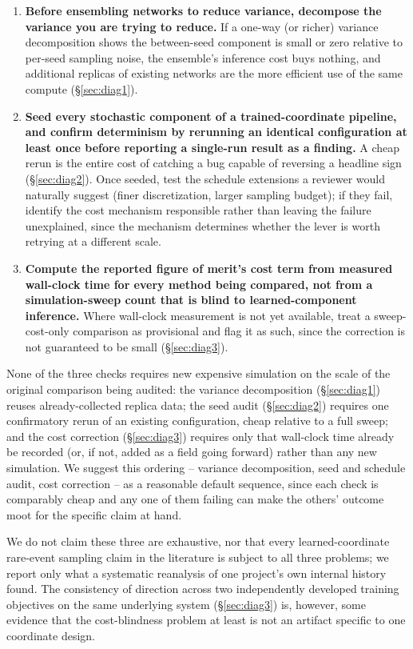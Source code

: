 \documentclass[a4paper,fleqn]{cas-sc}
\begin{document}
\begin{enumerate}[label=(\arabic*)]
\item \textbf{Before ensembling networks to reduce variance, decompose the
variance you are trying to reduce.} If a one-way (or richer) variance
decomposition shows the between-seed component is small or zero relative to
per-seed sampling noise, the ensemble's inference cost buys nothing, and
additional replicas of existing networks are the more efficient use of the
same compute (\S\ref{sec:diag1}).
\item \textbf{Seed every stochastic component of a trained-coordinate
pipeline, and confirm determinism by rerunning an identical configuration
at least once before reporting a single-run result as a finding.} A cheap
rerun is the entire cost of catching a bug capable of reversing a headline
sign (\S\ref{sec:diag2}). Once seeded, test the schedule extensions a
reviewer would naturally suggest (finer discretization, larger sampling
budget); if they fail, identify the cost mechanism responsible rather than
leaving the failure unexplained, since the mechanism determines whether the
lever is worth retrying at a different scale.
\item \textbf{Compute the reported figure of merit's cost term from
measured wall-clock time for every method being compared, not from a
simulation-sweep count that is blind to learned-component inference.} Where
wall-clock measurement is not yet available, treat a sweep-cost-only
comparison as provisional and flag it as such, since the correction is not
guaranteed to be small (\S\ref{sec:diag3}).
\end{enumerate}

None of the three checks requires new expensive simulation on the scale
of the original comparison being audited: the variance decomposition
(\S\ref{sec:diag1}) reuses already-collected replica data; the seed audit
(\S\ref{sec:diag2}) requires one confirmatory rerun of an existing
configuration, cheap relative to a full sweep; and the cost correction
(\S\ref{sec:diag3}) requires only that wall-clock time already be recorded
(or, if not, added as a field going forward) rather than any new
simulation. We suggest this ordering -- variance decomposition, seed and
schedule audit, cost correction -- as a reasonable default sequence, since
each check is comparably cheap and any one of them failing can make the
others' outcome moot for the specific claim at hand.

We do not claim these three are exhaustive, nor that every
learned-coordinate rare-event sampling claim in the literature is subject to
all three problems; we report only what a systematic reanalysis of one
project's own internal history found. The consistency of direction across
two independently developed training objectives on the same underlying
system (\S\ref{sec:diag3}) is, however, some evidence that the cost-blindness
problem at least is not an artifact specific to one coordinate design.
\end{document}
